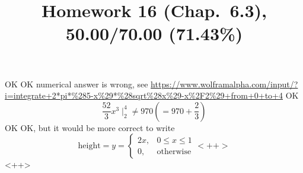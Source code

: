 \documentclass[10pt]{article} %
\title{Homework 16 (Chap.~6.3),
50.00/70.00 (71.43\%)
}
\begin{document}
\maketitle
{}
OK
OK
numerical answer is wrong, see
\url{https://www.wolframalpha.com/input/?i=integrate+2*pi*\%285-x\%29*\%28sqrt\%28x\%29-x\%2F2\%29+from+0+to+4}
OK
\begin{equation*}
	\frac{52}{3}x^3\mid^4_2\neq 970 \left( =970+\frac{2}{3} \right)
\end{equation*}
OK
OK, but it would be more correct to write
\begin{equation*}
	\mbox{height}=y=\begin{cases}
		2x,&0\le x\le1\\
		0,&\mbox{otherwise}
	\end{cases}<++>
\end{equation*}<++>
\end{document}
